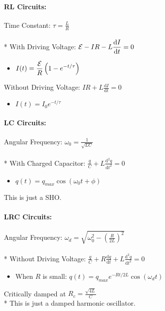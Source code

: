 \paragraph{RL Circuits:}
Time Constant: \(\displaystyle\tau=\frac{L}{R}\)\\\\*
With Driving Voltage: \(\displaystyle{\cal E} - IR-L\frac{\mathrm{d}I}{\mathrm{d}t}=0\)
\begin{itemize}
\item \(\displaystyle I(t)=\frac{{\cal E}}{R}\left(1-e^{-t/\tau}\right)\)
\end{itemize}
Without Driving Voltage: \(\displaystyle IR+L\frac{\mathrm{d}I}{\mathrm{d}t}=0\)
\begin{itemize}
\item \(\displaystyle I(t)=I_0e^{-t/\tau}\)
\end{itemize}

\paragraph{LC Circuits:}
Angular Frequency: \(\displaystyle\omega_{0}=\frac{1}{\sqrt{LC}}\)\\\\*
With Charged Capacitor: \(\displaystyle \frac{q}{C}+L\frac{\mathrm{d}^2q}{\mathrm{d}t^2}=0\)
\begin{itemize}
\item \(\displaystyle q(t)=q_{max}\cos(\omega_{0}t+\phi)\)
\end{itemize}
This is just a SHO.

\paragraph{LRC Circuits:}
Angular Frequency: \(\displaystyle\omega_{d}=\sqrt{\omega_0^2-\left(\frac{R}{2L}\right)^2}\)\\\\*
Without Driving Voltage: \(\displaystyle \frac{q}{C}+R\frac{\mathrm{d}q}{\mathrm{d}t}+L\frac{\mathrm{d}^2q}{\mathrm{d}t^2}=0\)
\begin{itemize}
\item When \(R\) is small: \(\displaystyle q(t)=q_{max}e^{-Rt/2L}\cos(\omega_{d}t)\)
\end{itemize}
Critically damped at \(R_c=\frac{\sqrt{4L}}{C}\)\\*
This is just a damped harmonic oscillator.

